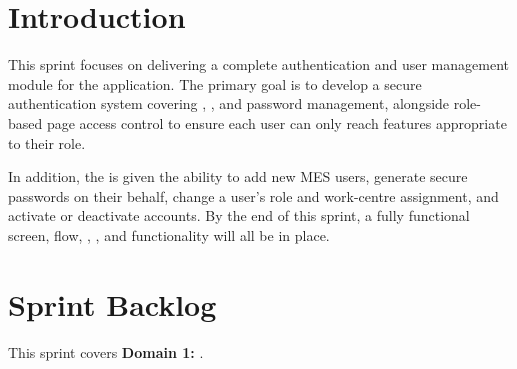 \minitoc
\newpage

\section*{Introduction}

This sprint focuses on delivering a complete authentication and user management
module for the  application. The primary goal is to develop a
secure authentication system covering , , and
password management, alongside role-based page access control to ensure each
user can only reach features appropriate to their role.

In addition, the  is given the ability to add new MES
users, generate secure passwords on their behalf, change a user's role and
work-centre assignment, and activate or deactivate accounts. By the end of this
sprint, a fully functional  screen, 
flow, , ,
and  functionality will all be in place.


\section{Sprint Backlog}

This sprint covers \textbf{Domain 1:} \textbf{}.



